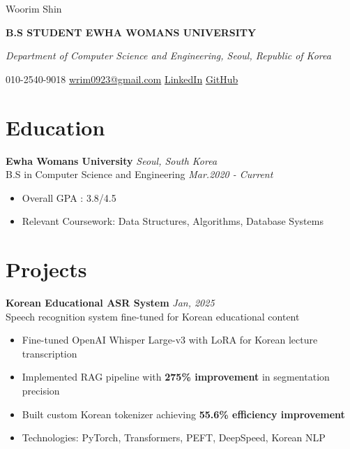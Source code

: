 \documentclass[11pt,a4paper]{article}
\newcommand{\name}[1]{
  \begin{center}
    {\huge\textcolor{textblack}{#1}}
  \end{center}
  \vspace{0.3em}
}
\newcommand{\subtitle}[1]{
  \begin{center}
    \textcolor{textgray}{\textbf{#1}}
  \end{center}
  \vspace{0.2em}
}
\newcommand{\contact}[4]{
  \begin{center}
    \textcolor{textgray}{#1} \quad \textbar \quad
    \href{mailto:#2}{\textcolor{linkcolor}{#2}} \quad \textbar \quad
    \href{#3}{\textcolor{linkcolor}{LinkedIn}} \quad \textbar \quad
    \href{#4}{\textcolor{linkcolor}{GitHub}}
  \end{center}
  \vspace{1.5em}
}
\begin{document}
\name{Woorim Shin}
\subtitle{B.S STUDENT \quad \textbullet \quad EWHA WOMANS UNIVERSITY}
\vspace{0.2em}
\begin{center}
\textcolor{textgray}{\textit{Department of Computer Science and Engineering, Seoul, Republic of Korea}}
\end{center}
\contact{010-2540-9018}{wrim0923@gmail.com}
{https://linkedin.com/in/woorimshin}{https://github.com/RainyForest23}

\section{Education}

\textbf{Ewha Womans University} \hfill \textcolor{textgray}{\textit{Seoul, South Korea}}\\
\textcolor{textgray}{B.S in Computer Science and Engineering} \hfill \textcolor{textgray}{\textit{Mar.2020 - Current}}
\begin{itemize}[leftmargin=1em, itemsep=0.1em, topsep=0.2em]
  \item Overall GPA : 3.8/4.5
  \item Relevant Coursework: Data Structures, Algorithms, Database Systems
\end{itemize}

\vspace{1em}

\section{Projects}

\textbf{Korean Educational ASR System} \hfill \textcolor{textgray}{\textit{Jan, 2025}}\\
\textcolor{textgray}{Speech recognition system fine-tuned for Korean educational content}
\begin{itemize}[leftmargin=1em, itemsep=0.2em, topsep=0.2em]
  \item Fine-tuned OpenAI Whisper Large-v3 with LoRA for Korean lecture transcription
  \item Implemented RAG pipeline with \textbf{275\% improvement} in segmentation precision
  \item Built custom Korean tokenizer achieving \textbf{55.6\% efficiency improvement}
  \item Technologies: PyTorch, Transformers, PEFT, DeepSpeed, Korean NLP
\end{itemize}
\end{document}
